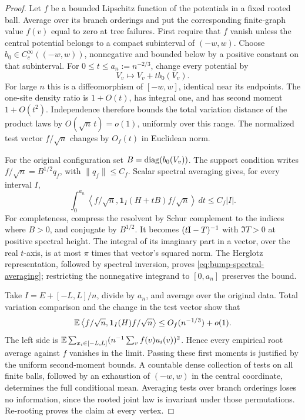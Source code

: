 \begin{proof}
Let \(f\) be a bounded Lipschitz function of the potentials in a
fixed rooted ball.  Average over its branch orderings and put the
corresponding finite-graph value \(f(v)\) equal to zero at tree
failures.  First require that \(f\) vanish unless the central
potential belongs to a compact subinterval of \((-w,w)\).  Choose
\(b_0\in C_c^\infty((-w,w))\), nonnegative and bounded below by a
positive constant on that subinterval.  For
\(0\le t\le a_n:=n^{-2/3}\), change every potential by
\[
 V_v\longmapsto V_v+t b_0(V_v).
\]
For large \(n\) this is a diffeomorphism of \([-w,w]\), identical
near its endpoints.  The one-site density ratio is \(1+O(t)\), has
integral one, and has second moment \(1+O(t^2)\).  Independence
therefore bounds the total variation distance of the product laws by
\(O(\sqrt n\,t)=o(1)\), uniformly over this range.  The normalized
test vector \(f/\sqrt n\) changes by \(O_f(t)\) in Euclidean norm.

For the original configuration set
\(B=\operatorname{diag}(b_0(V_v))\).  The support condition writes
\(f/\sqrt n=B^{1/2}q_f\), with \(\|q_f\|\le C_f\).  Scalar spectral
averaging gives, for every interval \(I\),
\begin{equation}\label{eq:bump-spectral-averaging}
 \int_0^{a_n}
 \left\langle f/\sqrt n,\mathbf1_I(H+tB)f/\sqrt n\right\rangle\,dt
 \le C_f|I|.
\end{equation}
For completeness, compress the resolvent by Schur complement to the
indices where \(B>0\), and conjugate by \(B^{1/2}\).  It becomes
\((t\mathrm I-T)^{-1}\) with \(\Im T>0\) at positive spectral height.
The integral of its imaginary part in a vector, over the real
\(t\)-axis, is at most \(\pi\) times that vector's squared norm.
The Herglotz representation, followed by spectral inversion, proves
\eqref{eq:bump-spectral-averaging}; restricting the nonnegative
integrand to \([0,a_n]\) preserves the bound.

Take \(I=E+[-L,L]/n\), divide by \(a_n\), and average over the
original data.  Total variation comparison and the change in the
test vector show that
\[
 \mathbb E\left\langle f/\sqrt n,\mathbf1_I(H)f/\sqrt n\right\rangle
 \le O_f(n^{-1/3})+o(1).
\]
The left side is
\(\mathbb E\sum_{x_i\in[-L,L]}(n^{-1}\sum_v f(v)u_i(v))^2\).
Hence every empirical root average against \(f\) vanishes in the
limit.  Passing these first moments is justified by the uniform
second-moment bounds.  A countable dense collection of tests on all
finite balls, followed by an exhaustion of \((-w,w)\) in the central
coordinate, determines the full conditional mean.  Averaging tests
over branch orderings loses no information, since the rooted joint
law is invariant under those permutations.  Re-rooting proves the
claim at every vertex.
\end{proof}

